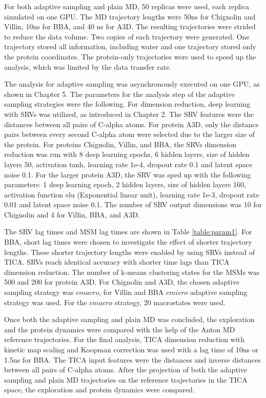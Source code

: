 For both adaptive sampling and plain MD, 50 replicas were used, each replica simulated on one GPU. The MD trajectory lengths were 50ns for Chignolin and Villin, 10ns for BBA, and 40 ns for A3D.  The resulting trajectories were strided to reduce the data volume. Two copies of each trajectory were generated. One trajectory stored all information, including water and one trajectory stored only the protein coordinates. The protein-only trajectories were used to speed up the analysis, which was limited by the data transfer rate.


The analysis for adaptive sampling was asynchronously executed on one GPU, as shown in Chapter 5. The parameters for the analysis step of the adaptive sampling strategies were the following.  For dimension reduction, deep learning with SRVs was utilized, as introduced in Chapter 2.
The SRV features were the distances between all pairs of C-alpha atoms. For protein A3D, only the distance pairs between every second C-alpha atom were selected due to the larger size of the protein.  For proteins Chignolin, Villin, and BBA, the SRVs dimension reduction was run with 8 deep learning epochs, 6 hidden layers, size of hidden layers 50, activation tanh, learning rate 1e-4, dropout rate 0.1 and latent space noise 0.1. For the larger protein A3D, the SRV was sped up with the following parameters: 1 deep learning epoch, 2 hidden layers, size of hidden layers 160, activation function elu (Exponential linear unit), learning rate 1e-3, dropout rate 0.01 and latent space noise 0.1. The number of SRV output dimensions was 10 for Chignolin and 4 for Villin, BBA, and A3D. 

The SRV lag times and MSM lag times are shown in Table \ref{table:param1}. For BBA, short lag times were chosen to investigate the effect of shorter trajectory lengths. These shorter trajectory lengths were enabled by using SRVs instead of TICA. SRVs reach identical accuracy with shorter time lags than TICA dimension reduction\cite{chen2019jcp}. The number of k-means clustering states for the MSMs was 500 and 200 for protein A3D. For Chignolin and A3D, the chosen adaptive sampling strategy was $cmacro$, for Villin and BBA $cmicro$ adaptive sampling strategy was used. For the $cmacro$ strategy, 20 macrostates were used.

Once both the adaptive sampling and plain MD was concluded, the exploration and the protein dynamics were compared with the help of the Anton MD reference trajectories. For the final analysis, TICA dimension reduction with kinetic map scaling and Koopman correction was used with a lag time of 10ns or 1.5ns for BBA. The TICA input features were the distances and inverse distances between all pairs of C-alpha atoms. After the projection of both the adaptive sampling and plain MD trajectories on the reference trajectories in the TICA space, the exploration and protein dynamics were compared.

